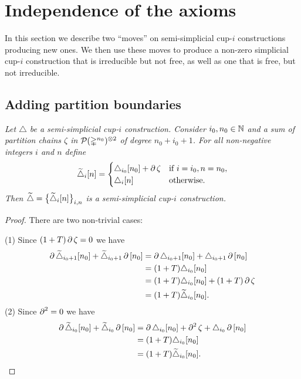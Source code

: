 \section{Independence of the axioms}

In this section we describe two ``moves'' on semi-simplicial cup-$i$ constructions producing new ones.
We then use these moves to produce a non-zero simplicial cup-$i$ construction that is irreducible but not free, as well as one that is free, but not irreducible.

\subsection{Adding partition boundaries}\label{ss:adding_partition_boundaries}

\textit{
	Let $\triangle$ be a semi-simplicial \mbox{cup-$i$} construction.
	Consider $i_0, n_0 \in \N$ and a sum of partition chains $\zeta$ in $\cP(\simplex^{n_0})^{\ot 2}$ of degree $n_0+i_0+1$.
	For all non-negative integers $i$ and $n$ define
	\[
	\widetilde\triangle_i[n] =
	\begin{cases}
		\triangle_{i_0}[n_0] + \bd\zeta & \text{if } i=i_0, n=n_0, \\
		\triangle_{i}[n] & \text{otherwise}.
	\end{cases}
	\]
	Then $\widetilde\triangle = \set[\big]{\widetilde\triangle_i[n]}_{i,n}$ is a semi-simplicial \mbox{cup-$i$} construction.
}

\begin{proof}
	There are two non-trivial cases:

	\medskip\noindent(1) Since $(1+T)\bd\zeta = 0$ we have
	\begin{align*}
		\bd \widetilde\triangle_{i_0+1}[n_0] + \widetilde\triangle_{i_0+1} \bd \,[n_0] &=
		\bd \triangle_{i_0+1}[n_0] + \triangle_{i_0+1} \bd \,[n_0] \\ &=
		(1+T)\triangle_{i_0}[n_0] \\ &=
		(1+T)\triangle_{i_0}[n_0] + (1+T) \bd \zeta \\ &=
		(1+T)\widetilde\triangle_{i_0}[n_0] .
	\end{align*}
	(2) Since $\bd^2 = 0$ we have
	\begin{align*}
		\bd \widetilde\triangle_{i_0}[n_0] + \widetilde\triangle_{i_0} \bd \,[n_0] &=
		\bd \triangle_{i_0}[n_0] + \bd^2 \zeta + \triangle_{i_0} \bd \,[n_0] \\ &=
		(1+T)\triangle_{i_0}[n_0] \\ &=
		(1+T)\widetilde\triangle_{i_0}[n_0]. \qedhere
	\end{align*}
\end{proof}


